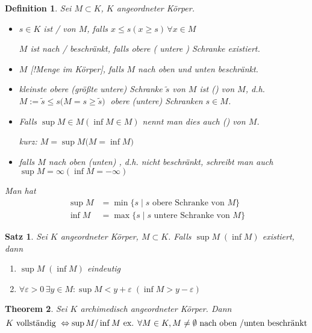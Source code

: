 \documentclass[ngerman,a4paper]{report}
\theoremstyle{break}
\newtheorem{theorem}{Theorem}[section]
\newtheorem{satz}[theorem]{Satz}
\newtheorem*{definition}{Definition}
\newcommand{\highlight}[1]{\emph{#1}}
\renewcommand{\epsilon}{\varepsilon}
\begin{document}
\begin{definition}
	Sei $M\subset K$, $K$ angeordneter Körper.
	\begin{itemize}
		\item $s\in K$ ist  /   von $M$, falls $x \le s (x \ge s)\,\forall x\in M$
		
		$M$ ist nach  /  \highlight{beschränkt}, falls obere ( untere ) Schranke existiert.
		\item $M$ [!Menge im Körper], falls $M$ nach oben und unten beschränkt.
		\item kleinste obere (größte untere) Schranke $\tilde{s}$ von $M$ ist  () von $M$, d.h. \\
		$ M:= \tilde{s} \le s ($$ M = s \ge \tilde{s}) \;$ obere (untere) Schranken $s\in M$.
		\item Falls $\sup M \in M (\inf M\in M)$ nennt man dies auch  () von $M$.
		
		kurz: $M = \sup M ($$M = \inf M)$
		\item falls $M$ nach oben (unten) , d.h. nicht beschränkt, schreibt man auch $\sup M = \infty (\inf M = -\infty)$
	\end{itemize}

	Man hat
	\begin{align*}
	\sup M &= \min\{s \mid s \text{ obere Schranke von } M\}\\
	\inf M &= \max\{s \mid s \text{ untere Schranke von } M\}
	\end{align*}
\end{definition}
\begin{satz}
	Sei $K$ angeordneter Körper, $M\subset K$. Falls $\sup M\;(\inf M)$ existiert, dann
	\begin{enumerate}[label={\arabic*)}]
		\item $\sup M\;(\inf M)$ eindeutig
		\item $\forall \epsilon > 0\,\exists y\in M: \sup M < y + \epsilon\;(\inf M > y - \epsilon)$
	\end{enumerate}
\end{satz}

\begin{theorem}
	Sei $K$ archimedisch angeordneter Körper. Dann
	\[ K \text{ vollständig } \Leftrightarrow \sup M \slash \inf M \text{ ex. }\forall M\in K, M\neq \emptyset \text{ nach oben \slash unten beschränkt} \]
\end{theorem}
\end{document}
